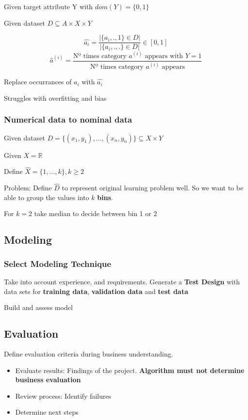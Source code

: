 \documentclass{article}
\begin{document}
Given target attribute Y with $dom(Y) = \{0,1\}$

Given dataset $D\subseteq A\times X \times Y$

\[\hat{a_i} = \frac{|\{a_i,.,1\}\in D|}{|\{a_i,.,.\}\in D|} \in [0,1]\]
\[\hat{a}^{(i)} = \frac{\text{Nº times category } a^{(i)} \text{ appears with } Y=1} {\text{Nº times category } a^{(i)} \text{ appears}}\]

Replace occurrances of $a_i$ with $\hat{a_i}$

Struggles with overfitting and bias
\subsubsection{Numerical data to nominal data}
Given dataset $D = \{(x_1,y_1),\dots,(x_n,y_n)\}\subseteq X\times Y $

Given $X = \mathbb{R}$

Define $\hat{X} = \{1,\dots,k\}, k\geq 2$

Problem: Define $\hat{D}$ to represent original learning problem well. So we want to be able to group the values into $k$ \textbf{bins}.

For $k=2$ take median to decide between bin 1 or 2

\subsection{Modeling}
\subsubsection{Select Modeling Technique}
Take into account experience, and requirements. Generate a \textbf{Test Design} with data sets for \textbf{training data}, \textbf{validation data} and \textbf{test data}

Build and assess model
\subsection{Evaluation}
Define evaluation criteria during business understanding.

\begin{itemize}
  \item Evaluate results: Findings of the project. \textbf{Algorithm must not determine business evaluation}
  \item Review process: Identify failures
  \item Determine next steps
\end{itemize}
\end{document}
